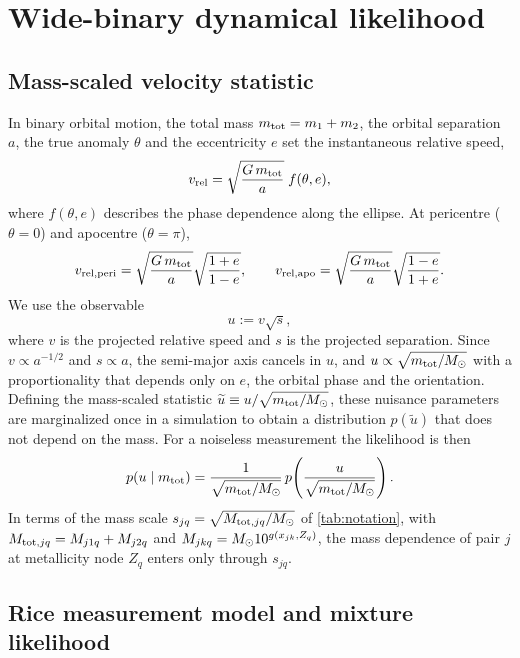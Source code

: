 \section{Wide-binary dynamical likelihood}
\label{sec:dynamics}

\subsection{Mass-scaled velocity statistic}

In binary orbital motion, the total mass $m_{\rm tot}=m_1+m_2$, the orbital separation $a$, the true anomaly $\theta$ and the eccentricity $e$ set the instantaneous relative speed,
\begin{equation}
    v_{\rm rel} = \sqrt{\frac{G\,m_{\rm tot}}{a}}\; f(\theta,e),
\end{equation}
where $f(\theta,e)$ describes the phase dependence along the ellipse. At pericentre ($\theta=0$) and apocentre ($\theta=\pi$),
\begin{equation}
    v_{\rm rel,peri} = \sqrt{\frac{G\,m_{\rm tot}}{a}} \sqrt{\frac{1+e}{1-e}},
    \qquad
    v_{\rm rel,apo} = \sqrt{\frac{G\,m_{\rm tot}}{a}} \sqrt{\frac{1-e}{1+e}}.
\end{equation}
We use the observable
\begin{equation}
    u := v \sqrt{s},
    \label{eq:u}
\end{equation}
where $v$ is the projected relative speed and $s$ is the projected separation. Since $v\propto a^{-1/2}$ and $s\propto a$, the semi-major axis cancels in $u$, and $u\propto\sqrt{m_{\rm tot}/M_{\odot}}$ with a proportionality that depends only on $e$, the orbital phase and the orientation. Defining the mass-scaled statistic $\widetilde u\equiv u/\sqrt{m_{\rm tot}/M_{\odot}}$, these nuisance parameters are marginalized once in a simulation to obtain a distribution $p(\widetilde u)$ that does not depend on the mass. For a noiseless measurement the likelihood is then
\begin{equation}
    p(u\mid m_{\rm tot}) = \frac{1}{\sqrt{m_{\rm tot}/M_{\odot}}}\,p\!\left(\frac{u}{\sqrt{m_{\rm tot}/M_{\odot}}}\right).
\end{equation}
In terms of the mass scale $s_{jq}=\sqrt{M_{{\rm tot},jq}/M_{\odot}}$ of \cref{tab:notation}, with $M_{{\rm tot},jq}=M_{j1q}+M_{j2q}$ and $M_{jkq}=M_{\odot}10^{g(x_{jk},Z_q)}$, the mass dependence of pair $j$ at metallicity node $Z_q$ enters only through $s_{jq}$.

\subsection{Rice measurement model and mixture likelihood}

